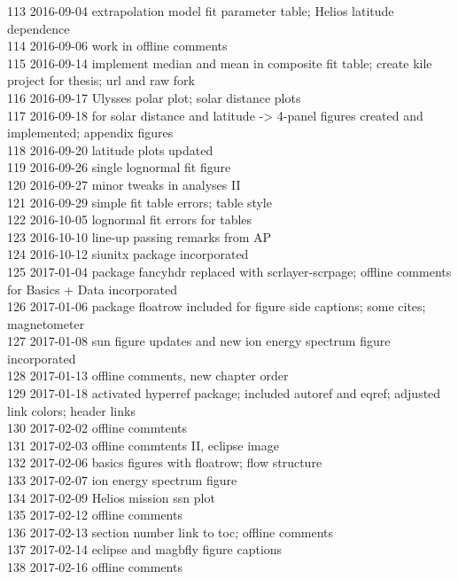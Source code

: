\begin{footnotesize}
113	2016-09-04	extrapolation model fit parameter table; Helios latitude dependence\\
114	2016-09-06	work in offline comments\\
115	2016-09-14	implement median and mean in composite fit table; create kile project for thesis; url and raw fork\\
116	2016-09-17	Ulysses polar plot; solar distance plots\\
117	2016-09-18	for solar distance and latitude -> 4-panel figures created and implemented; appendix figures\\
118	2016-09-20	latitude plots updated\\
119	2016-09-26	single lognormal fit figure\\
120	2016-09-27	minor tweaks in analyses II\\
121	2016-09-29	simple fit table errors; table style\\
122	2016-10-05	lognormal fit errors for tables\\
123	2016-10-10	line-up passing remarks from AP\\
124	2016-10-12	siunitx package incorporated\\
125	2017-01-04	package fancyhdr replaced with scrlayer-scrpage; offline comments for Basics + Data incorporated\\
126	2017-01-06	package floatrow included for figure side captions; some cites; magnetometer\\
127	2017-01-08	sun figure updates and new ion energy spectrum figure incorporated\\
128	2017-01-13	offline comments, new chapter order\\
129	2017-01-18	activated hyperref package; included autoref and eqref; adjusted link colors; header links\\
130	2017-02-02	offline commtents\\
131	2017-02-03	offline commtents II, eclipse image\\
132	2017-02-06	basics figures with floatrow; flow structure\\
133	2017-02-07	ion energy spectrum figure\\
134	2017-02-09	Helios mission ssn plot\\
135	2017-02-12	offline comments\\
136	2017-02-13	section number link to toc; offline comments\\
137	2017-02-14	eclipse and magbfly figure captions\\
138	2017-02-16	offline comments\\

\end{footnotesize}
